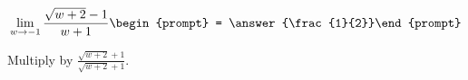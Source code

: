 \documentclass{ximera}
\author{Bart Snapp}
\begin{document}
\begin{exercise}

\[
\lim_{w\to -1 } \frac{\sqrt{w+2}-1}{w+1}\begin{prompt} = \answer{\frac{1}{2}}\end{prompt}
\]
\begin{hint}
Multiply by $\frac{\sqrt{w+2}+1}{\sqrt{w+2}+1}$.
\end{hint}
\end{exercise}
\end{document}
